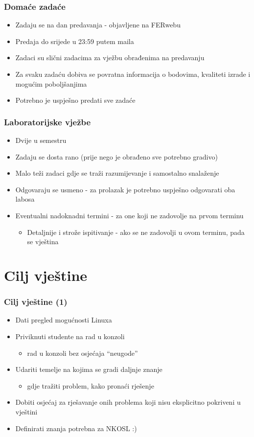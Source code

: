 \documentclass{beamer}
\begin{document}
\begin{frame}[t]
\frametitle{Domaće zadaće}
\begin{itemize}
	\item Zadaju se na dan predavanja - objavljene na FERwebu
	\item Predaja do srijede u 23:59 putem maila
	\item Zadaci su slični zadacima za vježbu obrađenima na predavanju
	\item Za svaku zadaću dobiva se povratna informacija o bodovima, kvaliteti izrade i mogućim poboljšanjima
	\item Potrebno je uspješno predati sve zadaće
\end{itemize}
\end{frame}

\begin{frame}[t]
\frametitle{Laboratorijske vježbe}
\begin{itemize}
	\item Dvije u semestru
	\item Zadaju se dosta rano (prije nego je obrađeno sve potrebno gradivo)
	\item Malo teži zadaci gdje se traži razumijevanje i samostalno snalaženje
	\item Odgovaraju se usmeno - za prolazak je potrebno uspješno odgovarati oba labosa
	\item Eventualni nadoknadni termini - za one koji ne zadovolje na prvom terminu
	\begin{itemize}
		\item Detaljnije i strože ispitivanje - ako se ne zadovolji u ovom terminu, pada se vještina
	\end{itemize}
\end{itemize}
\end{frame}

\section{Cilj vještine}
\begin{frame}[t]
\frametitle{Cilj vještine (1)}
\begin{itemize}
	\item Dati pregled mogućnosti Linuxa
	\item Priviknuti studente na rad u konzoli
	\begin{itemize}
		\item rad u konzoli bez osjećaja “neugode”
	\end{itemize}
	\item Udariti temelje na kojima se gradi daljnje znanje
	\begin{itemize}
		\item gdje tražiti problem, kako pronaći rješenje
	\end{itemize}
	\item Dobiti osjećaj za rješavanje onih problema koji nisu eksplicitno pokriveni u vještini
	\item Definirati znanja potrebna za NKOSL :)
\end{itemize}
\end{frame}
\end{document}
